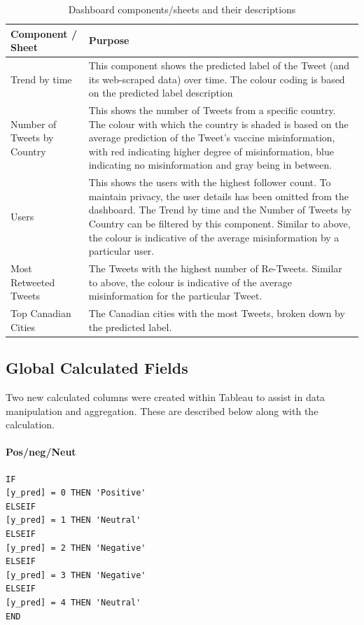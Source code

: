 \documentclass[12pt]{article}
\begin{document}
\begin{table}[tbp]
\centering
\begin{tabularx}{\linewidth}{ l X}
\toprule
   Component / Sheet & Purpose \\
\midrule
Trend by time & This component shows the predicted label of the Tweet (and its web-scraped data) over time. The colour coding is based on the predicted label description \newline \\
Number of Tweets by Country & This shows the number of Tweets from a specific country. The colour with which the country is shaded is based on the average prediction of the Tweet’s vaccine misinformation, with red indicating higher degree of misinformation, blue indicating no misinformation and gray being in between.  \newline \\
Users & This shows the users with the highest follower count. To maintain privacy, the user details has been omitted from the dashboard. The Trend by time and the Number of Tweets by Country can be filtered by this component. 
Similar to above, the colour is indicative of the average misinformation by a particular user. \newline \\
Most Retweeted Tweets & The Tweets with the highest number of Re-Tweets. 
Similar to above, the colour is indicative of the average misinformation for the particular Tweet. \newline \\
Top Canadian Cities & The Canadian cities with the most Tweets, broken down by the predicted label. \newline \\


\bottomrule
\end{tabularx}
\caption{Dashboard components/sheets and their descriptions}
\label{tbl:db_sheets}
\end{table}

\newpage
\subsection{Global Calculated Fields}
Two new calculated columns were created within Tableau to assist in data manipulation and aggregation. These are described below along with the calculation. 

\paragraph{Pos/neg/Neut}
\begin{verbatim} 
IF
[y_pred] = 0 THEN 'Positive' 
ELSEIF
[y_pred] = 1 THEN 'Neutral' 
ELSEIF
[y_pred] = 2 THEN 'Negative' 
ELSEIF
[y_pred] = 3 THEN 'Negative' 
ELSEIF
[y_pred] = 4 THEN 'Neutral' 
END
\end{verbatim}
\end{document}
